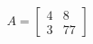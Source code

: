 \documentclass[preview]{standalone}
\begin{document}
\begin{align*}
A = \begin{bmatrix}
                        4 & 8\\
                        3 & 77
                    \end{bmatrix}
\end{align*}
\end{document}
